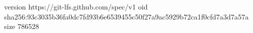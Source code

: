 version https://git-lfs.github.com/spec/v1
oid sha256:93c3035b36fa0dc7fd93b6e6539455c50f27a9ac5929b72ca1f0cfd7a3d7a57a
size 786528
